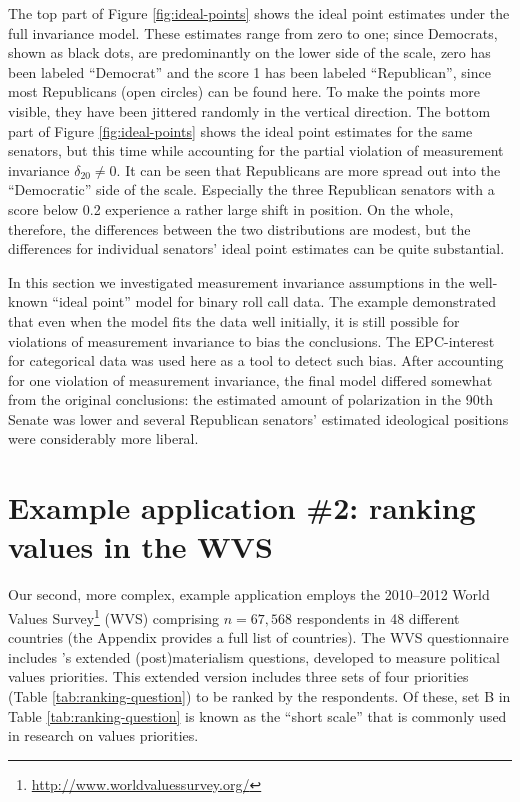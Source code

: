 \documentclass[letterpaper,12pt]{article}
\begin{document}
The top part of Figure \ref{fig:ideal-points} shows the ideal point estimates under the full invariance model. These estimates range from zero to one; since Democrats, shown as black dots, are predominantly on the lower side of the scale, zero has been labeled ``Democrat'' and the score 1 has been labeled ``Republican'', since most Republicans (open circles) can be found here. To make the points more visible, they have been jittered randomly in the vertical direction. The bottom part of Figure \ref{fig:ideal-points} shows the ideal point estimates for the same senators, but this time while accounting for the partial violation of measurement invariance $\delta_{20}\neq0$. It can be seen that Republicans  are more spread out into the ``Democratic'' side of the scale. Especially the three Republican senators with a score below 0.2 experience a rather large shift in position. On the whole, therefore, the differences between the two distributions are modest, but the differences for individual senators' ideal point estimates can be quite substantial.

\bigskip
In this section we investigated measurement invariance assumptions in the well-known ``ideal point'' model for  binary roll call data. The  example  demonstrated that even when the model fits the data well initially, it is still possible for violations of measurement invariance to bias the conclusions. The EPC-interest for categorical data was used here as a tool to detect such bias. After accounting for one violation of measurement invariance, the final model differed somewhat from the original conclusions: the estimated amount of polarization in the 90th Senate was lower and several Republican senators' estimated ideological positions were considerably more liberal. 





\section{Example application \#2: ranking values in the WVS}
\label{sec:WVS}

Our second, more complex, example application employs the 2010--2012 World Values Survey\footnote{\url{http://www.worldvaluessurvey.org/}} (WVS) comprising $n = 67,568$ respondents in 48 different countries (the Appendix provides a full list of countries).
The WVS questionnaire includes \citet{inglehart1981post}'s extended (post)materialism questions, developed to measure political values priorities. This extended version includes three sets of four priorities (Table \ref{tab:ranking-question}) to be ranked by the respondents. Of these, set B in Table \ref{tab:ranking-question} is known as the ``short scale'' that is commonly used in research on values priorities.  
\end{document}
